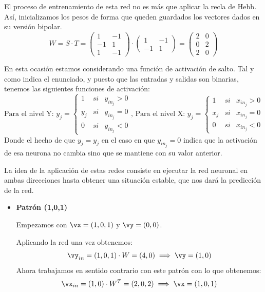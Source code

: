 \begin{problem}[10]
\spart

El proceso de entrenamiento de esta red no es más que aplicar la recla de Hebb. Así, inicializamos los pesos de forma que queden guardados los vectores dados en su versión bipolar.
\[W = S\cdot T = \left( \begin{array}{cc} 1 & -1 \\ -1 & 1 \\ 1 & -1 \end{array}\right)\cdot \left( \begin{array}{cc} 1 & -1 \\ -1 & 1\end{array} \right) = \left(\begin{array}{ccc}
2 & 0 \\
0 & 2 \\
2 & 0 \end{array} \right)\]

\spart En esta ocasión estamos considerando una función de activación de salto. Tal y como indica el enunciado, y puesto que las entradas y salidas son binarias, tenemos las siguientes funciones de activación:
\[\text{Para el nivel Y: } y_j = \left\{ \begin{array}{lll}
1   & si & y_{in_j} > 0 \\
y_j & si & y_{in_j} = 0 \\
0   & si & y_{in_j} < 0
\end{array}\right. \text{,   Para el nivel X: } y_j = \left\{ \begin{array}{lll}
1   & si & x_{in_j} > 0 \\
x_j & si & x_{in_j} = 0 \\
0   & si & x_{in_j} < 0
\end{array}\right.\]
Donde el hecho de que $y_j=y_j$ en el caso en que $y_{in_j}=0$ indica que la activación de esa neurona no cambia sino que se mantiene con su valor anterior.

La idea de la aplicación de estas redes consiste en ejecutar la red neuronal en ambas direcciones hasta obtener una situación estable, que nos dará la predicción de la red.

\begin{itemize}
\item \textbf{Patrón (1,0,1)}

Empezamos con $\vx=(1,0,1)$ y $\vy = (0,0)$.

Aplicando la red una vez obtenemos:
\[\vy_{in} = (1,0,1)\cdot W = (4,0) \implies \vy = (1,0)\]
Ahora trabajamos en sentido contrario con este patrón con lo que obtenemos:
\[\vx_{in} = (1,0)\cdot W^T = (2,0,2) \implies \vx = (1,0,1)\]


\end{itemize}
\end{problem}
